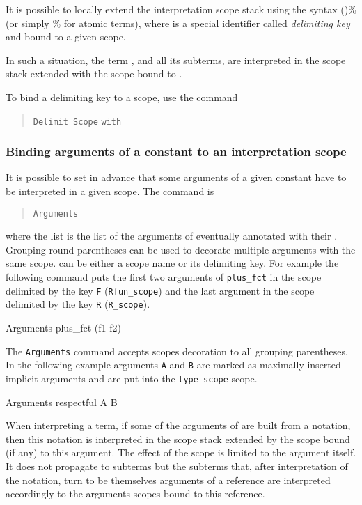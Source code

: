 It is possible to locally extend the interpretation scope stack using
the syntax ({\term})\%{\delimkey} (or simply {\term}\%{\delimkey}
for atomic terms), where {\delimkey} is a special identifier called
{\em delimiting key} and bound to a given scope.

In such a situation, the term {\term}, and all its subterms, are
interpreted in the scope stack extended with the scope bound to
{\delimkey}.

To bind a delimiting key to a scope, use the command

\begin{quote}
\texttt{Delimit Scope} {\scope} \texttt{with} {\ident} 
\end{quote}

\subsubsection{Binding arguments of a constant to an interpretation scope
}

It is possible to set in advance that some arguments of a given
constant have to be interpreted in a given scope. The command is
\begin{quote}
{\tt Arguments} {\qualid} \nelist{\name {\tt \%}\scope}{}
\end{quote}
where the list is the list of the arguments of {\qualid} eventually
annotated with their {\scope}. Grouping round parentheses can
be used to decorate multiple arguments with the same scope.
{\scope} can be either a scope name or its delimiting key. For example
the following command puts the first two arguments of {\tt plus\_fct}
in the scope delimited by the key {\tt F} ({\tt Rfun\_scope}) and the
last argument in the scope delimited by the key {\tt R} ({\tt R\_scope}).

\begin{coq_example*}
Arguments plus_fct (f1 f2)%
\end{coq_example*}

The {\tt Arguments} command accepts scopes decoration to all grouping
parentheses. In the following example arguments {\tt A} and {\tt B} 
are marked as maximally inserted implicit arguments and are
put into the {\tt type\_scope} scope.

\begin{coq_example*}
Arguments respectful {A B}%
\end{coq_example*}

When interpreting a term, if some of the arguments of {\qualid} are
built from a notation, then this notation is interpreted in the scope
stack extended by the scope bound (if any) to this argument. The
effect of the scope is limited to the argument itself. It does not propagate 
to subterms but the subterms that, after interpretation of the
notation, turn to be themselves arguments of a reference are
interpreted accordingly to the arguments scopes bound to this reference.

